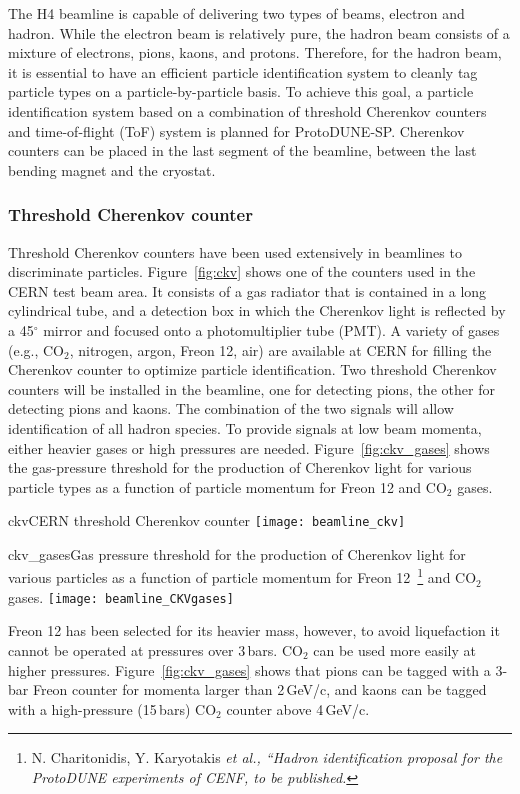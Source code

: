 The H4 beamline is capable of delivering two types of beams, electron and hadron. %
While the electron beam is relatively pure, the hadron beam consists of a mixture of electrons, pions, kaons, and protons. Therefore, for the hadron beam, it is essential to have an efficient particle identification system to cleanly tag particle types on a particle-by-particle basis. To achieve this goal, a particle identification system based on a combination of threshold Cherenkov counters and time-of-flight (ToF) system is planned for ProtoDUNE-SP. 
Cherenkov counters can be placed in the last segment of the beamline, between the last bending magnet and the cryostat. 

\subsubsection{Threshold Cherenkov counter}
Threshold Cherenkov counters have been used extensively in beamlines to discriminate particles. Figure~\ref{fig:ckv} shows one of the counters used in the CERN test beam area. It consists of a gas radiator that is contained in a long cylindrical tube, and a detection box in which the Cherenkov light is reflected by a 45$^\circ$ mirror and focused onto a photomultiplier tube (PMT). 
A variety of gases (e.g., CO$_2$, nitrogen, argon, Freon 12, air) are available at CERN for filling the Cherenkov counter to optimize particle identification. 
Two threshold Cherenkov counters will be installed in the beamline, one for detecting pions, the other for detecting pions 
and kaons. The combination of the two signals will allow identification of all hadron species. To provide signals at low beam momenta, either heavier gases or high pressures are needed.
Figure~\ref{fig:ckv_gases} shows the gas-pressure threshold 
for the production of Cherenkov light for various particle types as a function of particle momentum for Freon 12 and CO$_2$ gases.
\begin{cdrfigure}{ckv}{CERN threshold Cherenkov counter}
  \texttt{[image: beamline\_ckv]}
\end{cdrfigure}
\begin{cdrfigure}{ckv_gases}{Gas pressure threshold for the production of Cherenkov light for various particles as a function of particle momentum for Freon 12~\footnote{N. Charitonidis, Y. Karyotakis \it{et al.}, ``Hadron identification proposal for the ProtoDUNE experiments of CENF, to be published.} and CO$_2$ gases.}
  \texttt{[image: beamline\_CKVgases]}
\end{cdrfigure}
Freon 12 has been selected for its heavier mass, however,  to avoid liquefaction it cannot be operated at pressures over 3\,bars.  CO$_2$ can be used more easily at higher pressures.  
 Figure~\ref{fig:ckv_gases} shows that pions can be tagged with a 3-bar Freon counter for momenta larger than 2\,GeV/c, and kaons can be tagged with a high-pressure  (15\,bars) CO$_2$  counter above 4\,GeV/c.

